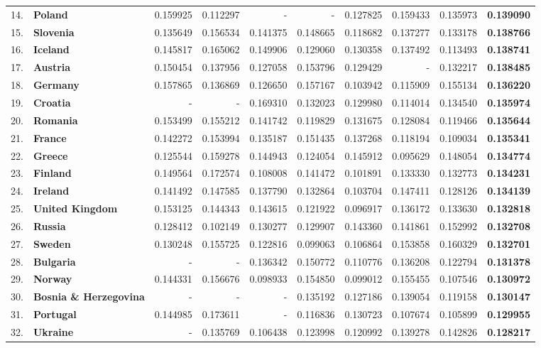 \documentclass[a4paper,11pt]{report}
\begin{document}
\begin{landscape}
\begin{longtable}{r l | r | r | r | r | r | r | r | r}
14.&\textbf{Poland}&0.159925&0.112297&-&-&0.127825&0.159433&0.135973&\textbf{0.139090}\\
15.&\textbf{Slovenia}&0.135649&0.156534&0.141375&0.148665&0.118682&0.137277&0.133178&\textbf{0.138766}\\
16.&\textbf{Iceland}&0.145817&0.165062&0.149906&0.129060&0.130358&0.137492&0.113493&\textbf{0.138741}\\
17.&\textbf{Austria}&0.150454&0.137956&0.127058&0.153796&0.129429&-&0.132217&\textbf{0.138485}\\
18.&\textbf{Germany}&0.157865&0.136869&0.126650&0.157167&0.103942&0.115909&0.155134&\textbf{0.136220}\\
19.&\textbf{Croatia}&-&-&0.169310&0.132023&0.129980&0.114014&0.134540&\textbf{0.135974}\\
20.&\textbf{Romania}&0.153499&0.155212&0.141742&0.119829&0.131675&0.128084&0.119466&\textbf{0.135644}\\
21.&\textbf{France}&0.142272&0.153994&0.135187&0.151435&0.137268&0.118194&0.109034&\textbf{0.135341}\\
22.&\textbf{Greece}&0.125544&0.159278&0.144943&0.124054&0.145912&0.095629&0.148054&\textbf{0.134774}\\
23.&\textbf{Finland}&0.149564&0.172574&0.108008&0.141472&0.101891&0.133330&0.132773&\textbf{0.134231}\\
24.&\textbf{Ireland}&0.141492&0.147585&0.137790&0.132864&0.103704&0.147411&0.128126&\textbf{0.134139}\\
25.&\textbf{United Kingdom}&0.153125&0.144343&0.143615&0.121922&0.096917&0.136172&0.133630&\textbf{0.132818}\\
26.&\textbf{Russia}&0.128412&0.102149&0.130277&0.129907&0.143360&0.141861&0.152992&\textbf{0.132708}\\
27.&\textbf{Sweden}&0.130248&0.155725&0.122816&0.099063&0.106864&0.153858&0.160329&\textbf{0.132701}\\
28.&\textbf{Bulgaria}&-&-&0.136342&0.150772&0.110776&0.136208&0.122794&\textbf{0.131378}\\
29.&\textbf{Norway}&0.144331&0.156676&0.098933&0.154850&0.099012&0.155455&0.107546&\textbf{0.130972}\\
30.&\textbf{Bosnia \& Herzegovina}&-&-&-&0.135192&0.127186&0.139054&0.119158&\textbf{0.130147}\\
31.&\textbf{Portugal}&0.144985&0.173611&-&0.116836&0.130723&0.107674&0.105899&\textbf{0.129955}\\
32.&\textbf{Ukraine}&-&0.135769&0.106438&0.123998&0.120992&0.139278&0.142826&\textbf{0.128217}\\

\end{longtable}
\end{landscape}
\end{document}
